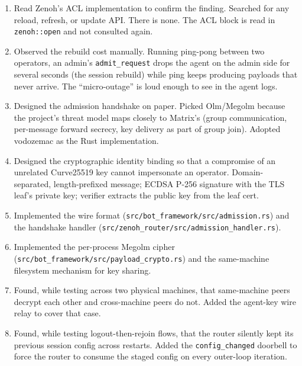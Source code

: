 \documentclass[11pt,a4paper]{article}
\begin{document}
\begin{enumerate}[leftmargin=1.6em]
  \item Read Zenoh's ACL implementation to confirm the
        finding. Searched for any reload, refresh, or update API.
        There is none. The ACL block is read in
        \texttt{zenoh::open} and not consulted again.
  \item Observed the rebuild cost manually. Running ping-pong
        between two operators, an admin's
        \texttt{admit\_request} drops the agent on the admin side
        for several seconds (the session rebuild) while ping
        keeps producing payloads that never arrive. The
        ``micro-outage'' is loud enough to see in the agent
        logs.
  \item Designed the admission handshake on paper. Picked
        Olm/Megolm because the project's threat model maps
        closely to Matrix's (group communication, per-message
        forward secrecy, key delivery as part of group join).
        Adopted vodozemac as the Rust implementation.
  \item Designed the cryptographic identity binding so that a
        compromise of an unrelated Curve25519 key cannot
        impersonate an operator. Domain-separated, length-prefixed
        message; ECDSA P-256 signature with the TLS leaf's
        private key; verifier extracts the public key from the
        leaf cert.
  \item Implemented the wire format
        (\texttt{src/bot\_framework/src/admission.rs}) and the
        handshake handler
        (\texttt{src/zenoh\_router/src/admission\_handler.rs}).
  \item Implemented the per-process Megolm cipher
        (\texttt{src/bot\_framework/src/payload\_crypto.rs}) and
        the same-machine filesystem mechanism for key sharing.
  \item Found, while testing across two physical machines, that
        same-machine peers decrypt each other and cross-machine
        peers do not. Added the agent-key wire relay to cover
        that case.
  \item Found, while testing logout-then-rejoin flows, that the
        router silently kept its previous session config across
        restarts. Added the \texttt{config\_changed} doorbell to
        force the router to consume the staged config on every
        outer-loop iteration.
\end{enumerate}

\end{document}
